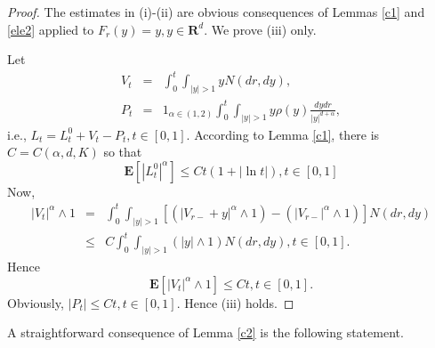 \documentclass[11pt]{amsart}
\theoremstyle{plain}
\numberwithin{equation}{section}
\begin{document}
\begin{proof}
The estimates in (i)-(ii) are obvious consequences of Lemmas \ref{c1} and \ref{ele2} applied to $F_{r}\left( y\right) =y,y\in \mathbf{R}^{d}$. We
prove (iii) only.

Let 
\begin{eqnarray*}
V_{t} &=&\int_{0}^{t}\int_{\left\vert y\right\vert >1}yN\left( dr,dy\right) ,
\\
P_{t} &=&1_{\alpha \in (1,2)}\int_{0}^{t}\int_{\left\vert y\right\vert
>1}y\rho \left( y\right) \frac{dydr}{\left\vert y\right\vert ^{d+\alpha }},
\end{eqnarray*}i.e., $L_{t}=L_{t}^{0}+V_{t}-P_{t},t\in \left[ 0,1\right] .$ According to
Lemma \ref{c1}, there is $C=C\left( \alpha,d ,K\right) $ so that\begin{equation*}
\mathbf{E}\left[ \left\vert L_{t}^{0}\right\vert ^{\alpha }\right] \leq
Ct(1+\left\vert \ln t\right\vert ),t\in \left[ 0,1\right]
\end{equation*}Now,\begin{eqnarray*}
\left\vert V_{t}\right\vert ^{\alpha }\wedge 1
&=&\int_{0}^{t}\int_{\left\vert y\right\vert >1}\left[ \left( \left\vert
V_{r-}+y\right\vert ^{\alpha }\wedge 1\right) -\left( \left\vert
V_{r-}\right\vert ^{\alpha }\wedge 1\right) \right] N\left( dr,dy\right) \\
&\leq &C\int_{0}^{t}\int_{\left\vert y\right\vert >1}\left( \left\vert
y\right\vert \wedge 1\right) N\left( dr,dy\right) ,t\in \left[ 0,1\right] .
\end{eqnarray*}Hence\begin{equation*}
\mathbf{E}\left[ \left\vert V_{t}\right\vert ^{\alpha }\wedge 1\right] \leq
Ct,t\in \left[ 0,1\right] .
\end{equation*}Obviously, $\left\vert P_{t}\right\vert \leq Ct,t\in \left[ 0,1\right] $.
Hence (iii) holds.
\end{proof}

A straightforward consequence of Lemma \ref{c2} is the following statement.
\end{document}
